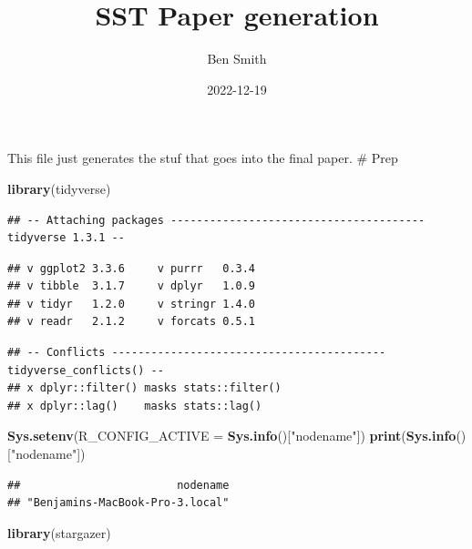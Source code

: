 \documentclass[
]{article}
\title{SST Paper generation}
\author{Ben Smith}
\date{2022-12-19}
\newenvironment{Shaded}{\begin{snugshade}}{\end{snugshade}}
\newcommand{\DataTypeTok}[1]{\textcolor[rgb]{0.13,0.29,0.53}{#1}}
\newcommand{\KeywordTok}[1]{\textcolor[rgb]{0.13,0.29,0.53}{\textbf{#1}}}
\newcommand{\NormalTok}[1]{#1}
\newcommand{\StringTok}[1]{\textcolor[rgb]{0.31,0.60,0.02}{#1}}
\begin{document}
\maketitle

{
\setcounter{tocdepth}{2}
\tableofcontents
}
This file just generates the stuf that goes into the final paper. \#
Prep

\begin{Shaded}
\begin{Highlighting}[]
\KeywordTok{library}\NormalTok{(tidyverse)}
\end{Highlighting}
\end{Shaded}

\begin{verbatim}
## -- Attaching packages --------------------------------------- tidyverse 1.3.1 --
\end{verbatim}

\begin{verbatim}
## v ggplot2 3.3.6     v purrr   0.3.4
## v tibble  3.1.7     v dplyr   1.0.9
## v tidyr   1.2.0     v stringr 1.4.0
## v readr   2.1.2     v forcats 0.5.1
\end{verbatim}

\begin{verbatim}
## -- Conflicts ------------------------------------------ tidyverse_conflicts() --
## x dplyr::filter() masks stats::filter()
## x dplyr::lag()    masks stats::lag()
\end{verbatim}

\begin{Shaded}
\begin{Highlighting}[]
\KeywordTok{Sys.setenv}\NormalTok{(}\DataTypeTok{R_CONFIG_ACTIVE =} \KeywordTok{Sys.info}\NormalTok{()[}\StringTok{"nodename"}\NormalTok{])}
\KeywordTok{print}\NormalTok{(}\KeywordTok{Sys.info}\NormalTok{()[}\StringTok{"nodename"}\NormalTok{])}
\end{Highlighting}
\end{Shaded}

\begin{verbatim}
##                        nodename 
## "Benjamins-MacBook-Pro-3.local"
\end{verbatim}

\begin{Shaded}
\begin{Highlighting}[]
\KeywordTok{library}\NormalTok{(stargazer)}
\end{Highlighting}
\end{Shaded}
\end{document}
